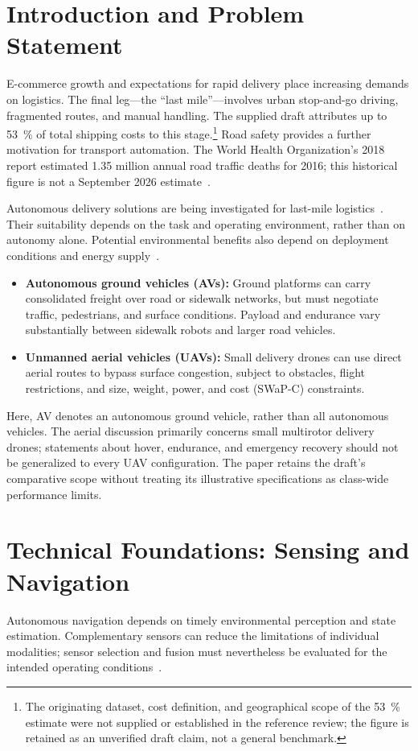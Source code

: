 \documentclass[11pt,a4paper]{article}
\begin{document}
\section{Introduction and Problem Statement}
E-commerce growth and expectations for rapid delivery place increasing demands on logistics. The final leg---the ``last mile''---involves urban stop-and-go driving, fragmented routes, and manual handling. The supplied draft attributes up to \SI{53}{\percent} of total shipping costs to this stage.\footnote{The originating dataset, cost definition, and geographical scope of the \SI{53}{\percent} estimate were not supplied or established in the reference review; the figure is retained as an unverified draft claim, not a general benchmark.} Road safety provides a further motivation for transport automation. The World Health Organization's 2018 report estimated \num{1.35} million annual road traffic deaths for 2016; this historical figure is not a September 2026 estimate~\cite{who2018}.

Autonomous delivery solutions are being investigated for last-mile logistics~\cite{engesser2023}. Their suitability depends on the task and operating environment, rather than on autonomy alone. Potential environmental benefits also depend on deployment conditions and energy supply~\cite{stolaroff2018}.

\begin{itemize}
    \item \textbf{Autonomous ground vehicles (AVs):} Ground platforms can carry consolidated freight over road or sidewalk networks, but must negotiate traffic, pedestrians, and surface conditions. Payload and endurance vary substantially between sidewalk robots and larger road vehicles.
    \item \textbf{Unmanned aerial vehicles (UAVs):} Small delivery drones can use direct aerial routes to bypass surface congestion, subject to obstacles, flight restrictions, and size, weight, power, and cost (SWaP-C) constraints.
\end{itemize}

Here, AV denotes an autonomous ground vehicle, rather than all autonomous vehicles. The aerial discussion primarily concerns small multirotor delivery drones; statements about hover, endurance, and emergency recovery should not be generalized to every UAV configuration. The paper retains the draft's comparative scope without treating its illustrative specifications as class-wide performance limits.

\section{Technical Foundations: Sensing and Navigation}
Autonomous navigation depends on timely environmental perception and state estimation. Complementary sensors can reduce the limitations of individual modalities; sensor selection and fusion must nevertheless be evaluated for the intended operating conditions~\cite{yeong2021,hasanujjaman2023}.
\end{document}
